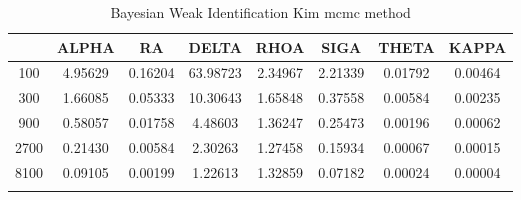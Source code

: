 \documentclass[a4paper,10pt]{article}
\begin{document}
\centering
\begin{longtable}{cccccccc}
\toprule
 & ALPHA & RA & DELTA & RHOA & SIGA & THETA & KAPPA \\
\midrule
100 & 4.95629 & 0.16204 & 63.98723 & 2.34967 & 2.21339 & 0.01792 & 0.00464 \\
300 & 1.66085 & 0.05333 & 10.30643 & 1.65848 & 0.37558 & 0.00584 & 0.00235 \\
900 & 0.58057 & 0.01758 & 4.48603 & 1.36247 & 0.25473 & 0.00196 & 0.00062 \\
2700 & 0.21430 & 0.00584 & 2.30263 & 1.27458 & 0.15934 & 0.00067 & 0.00015 \\
8100 & 0.09105 & 0.00199 & 1.22613 & 1.32859 & 0.07182 & 0.00024 & 0.00004 \\
\bottomrule
\caption{Bayesian Weak Identification Kim mcmc method}
\label{table:tbl:WeakKim_mcmc}
\end{longtable}
\end{document}
